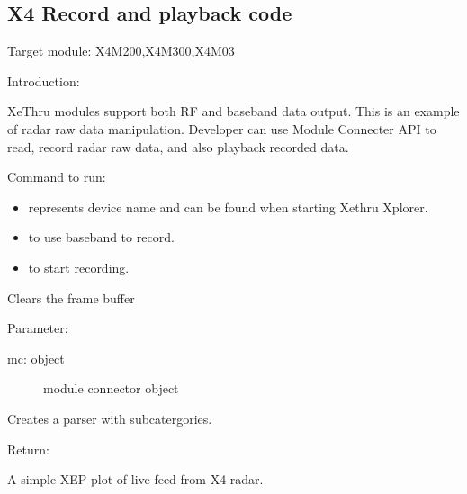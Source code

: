\documentclass[letterpaper,10pt,english]{sphinxmanual}
\begin{document}
\subsection{X4 Record and playback code}
\label{\detokenize{X4 radar:x4-record-and-playback-code}}
Target module: X4M200,X4M300,X4M03

Introduction:

XeThru modules support both RF and baseband data output. This is an example of radar raw data manipulation.
Developer can use Module Connecter API to read, record radar raw data, and also playback recorded data.

Command to run: 
\begin{itemize}
\item {} 
 represents device name and can be found when starting Xethru Xplorer.

\item {} 
 to use baseband to record.

\item {} 
 to start recording.

\end{itemize}
\label{\detokenize{X4 radar:module-X4_record_playback}}

\begin{fulllineitems}
\label{\detokenize{X4 radar:X4_record_playback.clear_buffer}}
Clears the frame buffer

Parameter:
\begin{description}
\item[{mc: object}] \leavevmode
module connector object

\end{description}

\end{fulllineitems}


\begin{fulllineitems}
\label{\detokenize{X4 radar:X4_record_playback.main}}
Creates a parser with subcatergories.

Return:

A simple XEP plot of live feed from X4 radar.

\end{fulllineitems}
\end{document}
